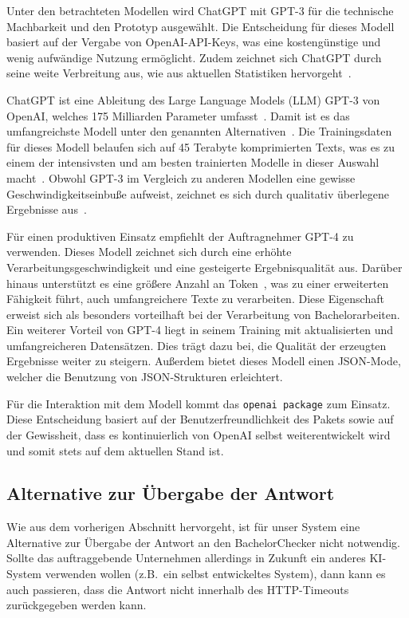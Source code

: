 Unter den betrachteten Modellen wird ChatGPT mit GPT-3 für die technische Machbarkeit und den Prototyp ausgewählt.
Die Entscheidung für dieses Modell basiert auf der Vergabe von OpenAI-API-Keys, was eine kostengünstige und wenig aufwändige Nutzung ermöglicht.
Zudem zeichnet sich ChatGPT durch seine weite Verbreitung aus, wie aus aktuellen Statistiken hervorgeht~\autocite{statista.gpt}.

ChatGPT ist eine Ableitung des Large Language Models (LLM) GPT-3 von OpenAI, welches 175 Milliarden Parameter umfasst~\autocite[][S. 5]{openai.gpt}.
Damit ist es das umfangreichste Modell unter den genannten Alternativen~\autocite{statista.gpt}.
Die Trainingsdaten für dieses Modell belaufen sich auf 45 Terabyte komprimierten Texts, was es zu einem der intensivsten und am besten trainierten Modelle in dieser Auswahl macht~\autocite[][S. 8]{openai.gpt}.
Obwohl GPT-3 im Vergleich zu anderen Modellen eine gewisse Geschwindigkeitseinbuße aufweist, zeichnet es sich durch qualitativ überlegene Ergebnisse aus~\autocite{mindsdb.llm}.

Für einen produktiven Einsatz empfiehlt der Auftragnehmer GPT-4 zu verwenden.
Dieses Modell zeichnet sich durch eine erhöhte Verarbeitungsgeschwindigkeit und eine gesteigerte Ergebnisqualität aus.
Darüber hinaus unterstützt es eine größere Anzahl an Token~\autocite{openai.gpt4}, was zu einer erweiterten Fähigkeit führt, auch umfangreichere Texte zu verarbeiten.
Diese Eigenschaft erweist sich als besonders vorteilhaft bei der Verarbeitung von Bachelorarbeiten.
Ein weiterer Vorteil von GPT-4 liegt in seinem Training mit aktualisierten und umfangreicheren Datensätzen.
Dies trägt dazu bei, die Qualität der erzeugten Ergebnisse weiter zu steigern.
Außerdem bietet dieses Modell einen \ac{JSON}-Mode, welcher die Benutzung von \ac{JSON}-Strukturen erleichtert.

Für die Interaktion mit dem Modell kommt das \texttt{openai package} zum Einsatz.
Diese Entscheidung basiert auf der Benutzerfreundlichkeit des Pakets sowie auf der Gewissheit,
dass es kontinuierlich von OpenAI selbst weiterentwickelt wird und somit stets auf dem aktuellen Stand ist.


\subsection{Alternative zur Übergabe der Antwort}\label{subsec:alternative-zur-uebergabe-der-antwort}
Wie aus dem vorherigen Abschnitt hervorgeht, ist für unser System eine Alternative zur Übergabe der Antwort
an den BachelorChecker nicht notwendig.
Sollte das auftraggebende Unternehmen allerdings in Zukunft ein anderes KI-System verwenden wollen (z.B.\ ein selbst entwickeltes System),
dann kann es auch passieren, dass die Antwort nicht innerhalb des HTTP-Timeouts zurückgegeben werden kann.


